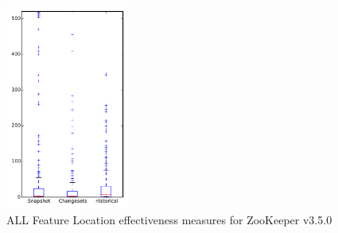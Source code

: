 
\begin{figure}[t]
\centering
\includegraphics[width=0.36\textwidth]{figures/flt/all_zookeeper}
\caption{ALL Feature Location effectiveness measures for ZooKeeper v3.5.0}
\label{fig:flt:all:zookeeper}
\end{figure}
